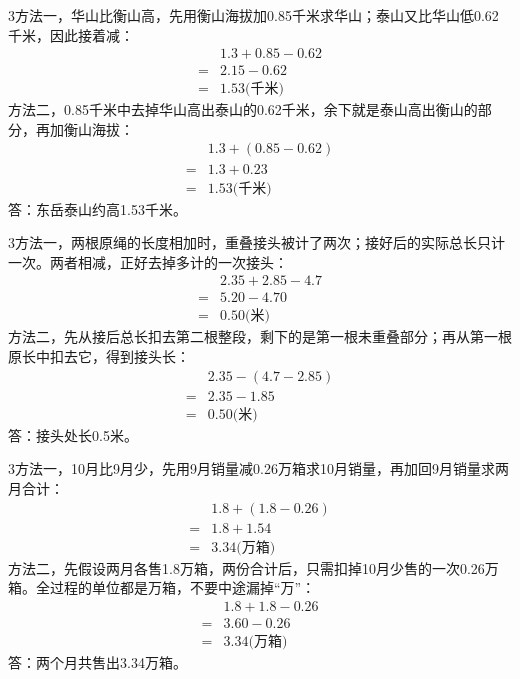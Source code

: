 \documentclass[multi=snippet,border={5bp 20bp 5bp 5bp}]{standalone}
\newenvironment{snippet}[3]{\begin{minipage}{#1bp}\color{answerred}\fontsize{#2}{#3}\selectfont\raggedright}{\end{minipage}}
\begin{document}
\begin{snippet}{505}{11.5}{14}\begin{multicols}{3}\raggedcolumns 方法一，华山比衡山高，先用衡山海拔加0.85千米求华山；泰山又比华山低0.62千米，因此接着减：\[\begin{aligned}&1.3+0.85-0.62\\={}&2.15-0.62\\={}&1.53\text{(千米)}\end{aligned}\]方法二，0.85千米中去掉华山高出泰山的0.62千米，余下就是泰山高出衡山的部分，再加衡山海拔：\[\begin{aligned}&1.3+(0.85-0.62)\\={}&1.3+0.23\\={}&1.53\text{(千米)}\end{aligned}\]答：东岳泰山约高1.53千米。\end{multicols}\end{snippet}
\begin{snippet}{505}{11.5}{14}\begin{multicols}{3}\raggedcolumns 方法一，两根原绳的长度相加时，重叠接头被计了两次；接好后的实际总长只计一次。两者相减，正好去掉多计的一次接头：\[\begin{aligned}&2.35+2.85-4.7\\={}&5.20-4.70\\={}&0.50\text{(米)}\end{aligned}\]方法二，先从接后总长扣去第二根整段，剩下的是第一根未重叠部分；再从第一根原长中扣去它，得到接头长：\[\begin{aligned}&2.35-(4.7-2.85)\\={}&2.35-1.85\\={}&0.50\text{(米)}\end{aligned}\]答：接头处长0.5米。\end{multicols}\end{snippet}
\begin{snippet}{505}{11.5}{14}\begin{multicols}{3}\raggedcolumns 方法一，10月比9月少，先用9月销量减0.26万箱求10月销量，再加回9月销量求两月合计：\[\begin{aligned}&1.8+(1.8-0.26)\\={}&1.8+1.54\\={}&3.34\text{(万箱)}\end{aligned}\]方法二，先假设两月各售1.8万箱，两份合计后，只需扣掉10月少售的一次0.26万箱。全过程的单位都是万箱，不要中途漏掉“万”：\[\begin{aligned}&1.8+1.8-0.26\\={}&3.60-0.26\\={}&3.34\text{(万箱)}\end{aligned}\]答：两个月共售出3.34万箱。\end{multicols}\end{snippet}
\end{document}

